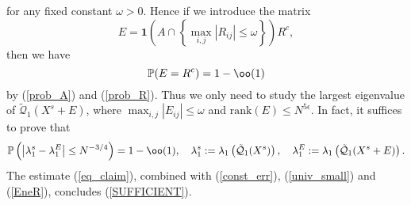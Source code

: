 for any fixed constant $\omega>0$. Hence if we introduce the matrix 
$$E = \mathbf 1\left(A\cap \left\{\max_{i,j} |R_{ij}| \leq \omega \right\}\right) R^c,$$
then we have 
\begin{equation}\label{EneR}
\mathbb P( E = R^c)=1-\oo(1)
\end{equation}
by (\ref{prob_A}) and (\ref{prob_R}). Thus we only need to study the largest eigenvalue of $\tilde {\mathcal Q}_1(X^s+E)$, where $\max_{i,j} |E_{ij}| \le \omega$ and $\text{rank}(E) \le N^{5\epsilon}$. In fact, it suffices to prove that
\begin{equation}\label{eq_claim}
\mathbb P\left(\left|\lambda_1^s - \lambda_1^E\right| \le N^{-3/4}\right) = 1-\oo(1), \quad \lambda_1^s:=\lambda_1\left(\tilde {\mathcal Q}_1(X^s) \right),\quad  \lambda_1^E:=\lambda_1\left(\tilde {\mathcal Q}_1(X^s+E) \right).
\end{equation}
The estimate (\ref{eq_claim}), combined with (\ref{const_err}), (\ref{univ_small}) and (\ref{EneR}), concludes (\ref{SUFFICIENT}).

